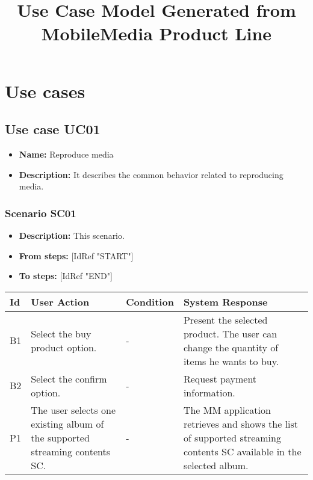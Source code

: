 \documentclass[a4paper,11pt]{article}
\title{Use Case Model Generated from MobileMedia Product Line}
\newcommand{\bl}{\\ \hline}
\begin{document}
\maketitle
\section{Use cases}
\subsection{Use case UC01}
\begin{itemize}
\item {\bf Name: }Reproduce media
\item {\bf Description: }It describes the common behavior related to reproducing media.
\end{itemize}
\subsubsection{Scenario SC01}
\begin{itemize}
\item {\bf Description:} This scenario.
\item {\bf From steps:} [IdRef "START"]
\item {\bf To steps:} [IdRef "END"]
\end{itemize}
\begin{tabular}{|p{0.4in}|p{1.5in}|p{1.5in}|p{1.5in}|}
\hline
Id & User Action & Condition & System Response \bl 
B1 & Select the buy product option.  & - & Present the selected product. The user can change the quantity of items he
                    wants to buy. \bl
B2 & Select the confirm option.  & - & Request payment information. \bl
P1 & 
                	The user selects one existing album of the supported streaming
					contents {SC}.
				 & - & 
                	The MM application retrieves and
					shows the list of supported streaming contents {SC}
					available in the selected album.
				\bl
\end{tabular}
\end{document}
